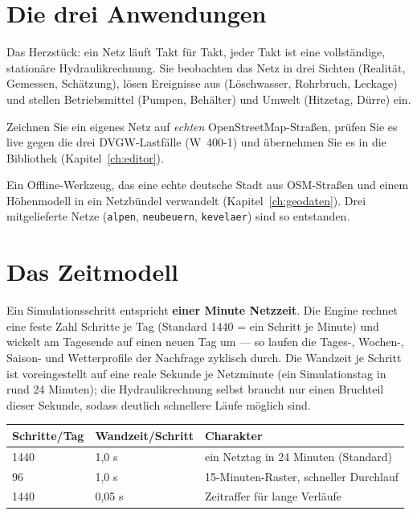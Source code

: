 \documentclass[11pt,a4paper,parskip=half]{scrreprt}
\newcommand{\ui}[1]{\textsf{\bfseries #1}}      %
\newcommand{\file}[1]{\texttt{#1}}              %
\begin{document}
\section{Die drei Anwendungen}

\begin{description}[style=nextline,leftmargin=1.2em]
\item[Live-Simulation] Das Herzstück: ein Netz läuft Takt für Takt, jeder Takt
  ist eine vollständige, stationäre Hydraulikrechnung. Sie beobachten das Netz in
  drei Sichten (Realität, Gemessen, Schätzung), lösen Ereignisse aus (Löschwasser,
  Rohrbruch, Leckage) und stellen Betriebsmittel (Pumpen, Behälter) und Umwelt
  (Hitzetag, Dürre) ein.
\item[NetzStudio-Editor] Zeichnen Sie ein eigenes Netz auf \emph{echten}
  OpenStreetMap-Straßen, prüfen Sie es live gegen die drei DVGW-Lastfälle (W~400-1)
  und übernehmen Sie es in die Bibliothek (Kapitel~\ref{ch:editor}).
\item[Geodaten-Bündelbauer] Ein Offline-Werkzeug, das eine echte deutsche Stadt
  aus OSM-Straßen und einem Höhenmodell in ein Netzbündel verwandelt
  (Kapitel~\ref{ch:geodaten}). Drei mitgelieferte Netze (\file{alpen},
  \file{neubeuern}, \file{kevelaer}) sind so entstanden.
\end{description}

\section{Das Zeitmodell}

Ein Simulationsschritt entspricht \textbf{einer Minute Netzzeit}. Die Engine
rechnet eine feste Zahl Schritte je Tag (Standard 1440 = ein Schritt je
Minute) und wickelt am Tagesende auf einen neuen Tag um — so laufen die
Tages-, Wochen-, Saison- und Wetterprofile der Nachfrage zyklisch durch. Die
Wandzeit je Schritt ist voreingestellt auf eine reale Sekunde je Netzminute (ein
Simulationstag in rund 24 Minuten); die Hydraulikrechnung selbst braucht nur
einen Bruchteil dieser Sekunde, sodass deutlich schnellere Läufe möglich sind.

\begin{center}
\begin{tabular}{@{}lll@{}}
\toprule
\ui{Schritte/Tag} & \ui{Wandzeit/Schritt} & Charakter \\
\midrule
1440 & 1,0 s & ein Netztag in 24 Minuten (Standard) \\
96   & 1,0 s & 15-Minuten-Raster, schneller Durchlauf \\
1440 & 0,05 s & Zeitraffer für lange Verläufe \\
\bottomrule
\end{tabular}
\end{center}
\end{document}
